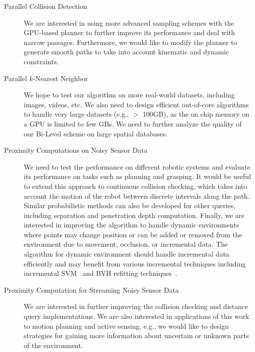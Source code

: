 \begin{description}
\item[Parallel Collision Detection] We are interested in using more advanced sampling schemes with the GPU-based planner to further improve its performance and deal with narrow passages. Furthermore, we would like to
modify the planner to generate smooth paths to take into account kinematic and dynamic constraints.
\item[Parallel $k$-Nearest Neighbor] We hope to test our algorithm on more real-world datasets, including images, videos, etc. We also need to design efficient out-of-core algorithms to handle very large datasets (e.g., $>$ 100GB), as the on chip memory on a GPU is limited to few GBs. We need to further analyze the quality of our Bi-Level scheme on large spatial databases.
\item[Proximity Computations on Noisy Sensor Data] We need to test the performance on different robotic systems and evaluate its performance
on tasks such as planning and grasping. It would be useful to extend this approach to continuous collision checking, which takes into account the motion of the robot
between discrete intervals along the path. Similar probabilistic methods can also be developed for other queries,
including separation and penetration depth computation. Finally, we are interested in improving the algorithm to handle dynamic environments where points may change position or can be added or removed from the environment due to movement, occlusion, or incremental data.
The algorithm for dynamic environment should handle incremental data efficiently and may benefit from various incremental techniques including incremental SVM~\cite{Gert:nips:2001} and BVH refitting techniques~\cite{Lauterbach10}.
\item[Proximity Computation for Streaming Noisy Sensor Data] We are interested in further improving the collision
checking and distance query implementations. We are also interested in
applications of this work to motion planning and active sensing, e.g., we would like
to design strategies for gaining more information about uncertain or
unknown parts of the environment.
\end{description}






